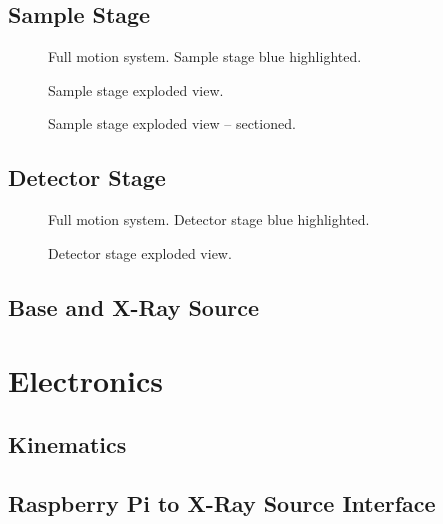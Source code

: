         \subsection{Sample Stage}
            \begin{figure}[t]
                \centering
                
                \label{fig:xmagix full sample highlightes}
                \caption[Full motion system. Sample stage blue highlighted.]{Full motion system. Sample stage blue highlighted.}
            \end{figure}
            \lipsum
            \begin{figure}[t]
                \centering
                
                \label{fig:sample stage exploded}%
                \caption[Sample stage exploded view.]{Sample stage exploded view.}
            \end{figure}
            \lipsum
            \begin{figure}[t]
                \centering
                
                \label{fig:sample stage exploded section}%
                \caption[Sample stage exploded view -- sectioned.]{Sample stage exploded view -- sectioned.}
            \end{figure}
        \subsection{Detector Stage}
            \begin{figure}[h]
                \centering
                
                \label{fig:xmagix full detector highlightes}
                \caption[Full motion system. Detector stage blue highlighted.]{Full motion system. Detector stage blue highlighted.}
            \end{figure}
            \lipsum
            \begin{figure}[t]
                \centering
                
                \label{fig:detector stage exploded section}%
                \caption[Detector stage exploded view.]{Detector stage exploded view.}
            \end{figure}
            \lipsum
        \subsection{Base and X-Ray Source}
            \lipsum

    \section{Electronics}
        \subsection{Kinematics}

        \subsection{Raspberry Pi to X-Ray Source Interface}